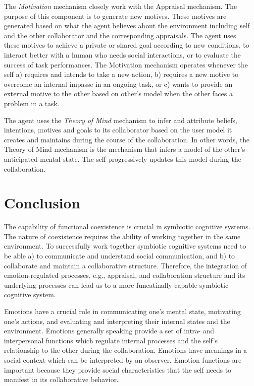 \documentclass[letterpaper]{article}
\begin{document}
The \textit{Motivation} mechanism closely work with the Appraisal mechanism. The
purpose of this component is to generate new motives. These motives are
generated based on what the agent believes about the environment including self
and the other collaborator and the corresponding appraisals. The agent uses
these motives to achieve a private or shared goal according to new conditions,
to interact better with a human who needs social interactions, or to evaluate
the success of task performances. The Motivation mechanism operates whenever the
self a) requires and intends to take a new action, b) requires a new motive to
overcome an internal impasse in an ongoing task, or c) wants to provide an
external motive to the other based on other's model when the other faces a
problem in a task.

The agent uses the \textit{Theory of Mind} mechanism to infer and attribute
beliefs, intentions, motives and goals to its collaborator based on the user
model it creates and maintains during the course of the collaboration. In
other words, the Theory of Mind mechanism is the mechanism that infers a model
of the other's anticipated mental state. The self progressively updates this
model during the collaboration.

\section{Conclusion}

The capability of functional coexistence is crucial in symbiotic cognitive
systems. The nature of coexistence requires the ability of working together in
the same environment. To successfully work together symbiotic cognitive systems
need to be able a) to communicate and understand social communication, and b) to
collaborate and maintain a collaborative structure. Therefore, the integration
of emotion-regulated processes, e.g., appraisal, and collaboration structure and
its underlying processes can lead us to a more funcatinally capable symbiotic
cognitive system.

Emotions have a crucial role in communicating one's mental state, motivating
one's actions, and evaluating and interpreting their internal states and the
environment. Emotions generally speaking provide a set of intra- and
interpersonal functions which regulate internal processes and the self's
relationship to the other during the collaboration.
Emotions have meanings in a social context which can be interpreted by an
observer. Emotion functions are important because they provide social
characteristics that the self needs to manifest in its collaborative behavior. 
\end{document}
